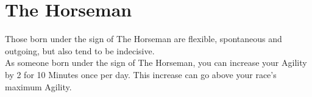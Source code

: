 \section{The Horseman}

Those born under the sign of The Horseman are flexible, spontaneous and outgoing, but also tend to be indecisive.\\
As someone born under the sign of The Horseman, you can increase your Agility by 2 for 10 Minutes once per day. This increase can go above your race's maximum Agility.\\
